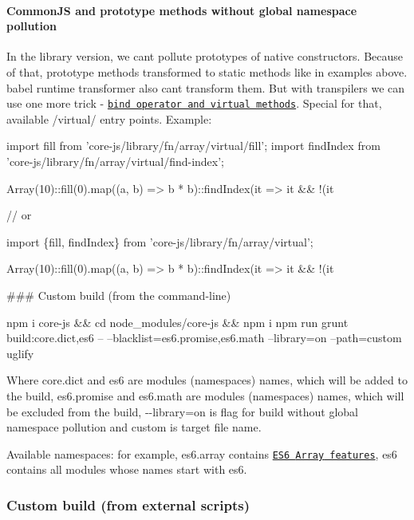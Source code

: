 \paragraph*{Common\+JS and prototype methods without global namespace pollution}

In the {\ttfamily library} version, we can\textquotesingle{}t pollute prototypes of native constructors. Because of that, prototype methods transformed to static methods like in examples above. {\ttfamily babel} {\ttfamily runtime} transformer also can\textquotesingle{}t transform them. But with transpilers we can use one more trick -\/ \href{https://github.com/zenparsing/es-function-bind}{\tt bind operator and virtual methods}. Special for that, available {\ttfamily /virtual/} entry points. Example\+: 
\begin{DoxyCode}
import fill from 'core-js/library/fn/array/virtual/fill';
import findIndex from 'core-js/library/fn/array/virtual/find-index';

Array(10)::fill(0).map((a, b) => b * b)::findIndex(it => it && !(it %

// or

import \{fill, findIndex\} from 'core-js/library/fn/array/virtual';

Array(10)::fill(0).map((a, b) => b * b)::findIndex(it => it && !(it %
\end{DoxyCode}


\#\#\# Custom build (from the command-\/line) 
\begin{DoxyCode}
npm i core-js && cd node\_modules/core-js && npm i
npm run grunt build:core.dict,es6 -- --blacklist=es6.promise,es6.math --library=on --path=custom uglify
\end{DoxyCode}
 Where {\ttfamily core.\+dict} and {\ttfamily es6} are modules (namespaces) names, which will be added to the build, {\ttfamily es6.\+promise} and {\ttfamily es6.\+math} are modules (namespaces) names, which will be excluded from the build, {\ttfamily -\/-\/library=on} is flag for build without global namespace pollution and {\ttfamily custom} is target file name.

Available namespaces\+: for example, {\ttfamily es6.\+array} contains \href{#ecmascript-6-array}{\tt E\+S6 {\ttfamily Array} features}, {\ttfamily es6} contains all modules whose names start with {\ttfamily es6}.

\subsubsection*{Custom build (from external scripts)}

